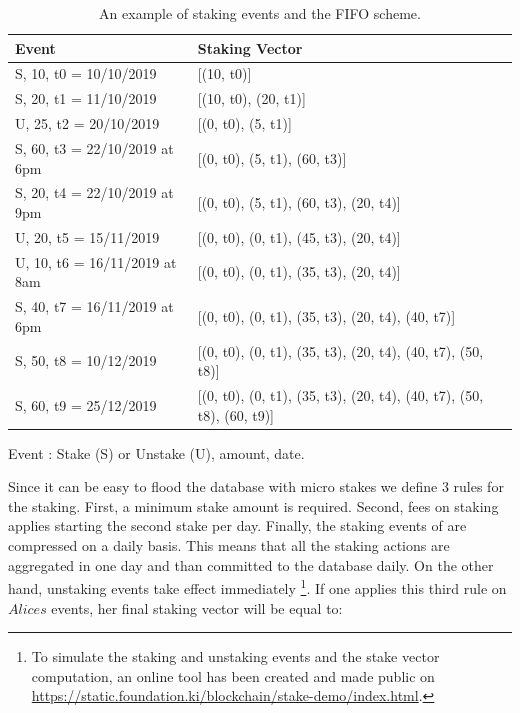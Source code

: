 \documentclass[]{article}
\begin{document}
\begin{table}[]
\centering
\begin{threeparttable}
\begin{tabular}{|l|p{8cm}|}
\hline
Event & Staking Vector \\
\hline
S, 10, t0 = 10/10/2019 & [(10, t0)]\\
S, 20, t1 = 11/10/2019 & [(10, t0), (20, t1)]\\
U, 25, t2 = 20/10/2019 & [(0, t0), (5, t1)]\\
S, 60, t3 = 22/10/2019 at 6pm  & [(0, t0), (5, t1), (60, t3)]\\
S, 20, t4 = 22/10/2019 at 9pm & [(0, t0), (5, t1), (60, t3), (20, t4)]\\
U, 20, t5 = 15/11/2019 & [(0, t0), (0, t1), (45, t3), (20, t4)]\\
U, 10, t6 = 16/11/2019 at 8am & [(0, t0), (0, t1), (35, t3), (20, t4)]\\
S, 40, t7 = 16/11/2019 at 6pm & [(0, t0), (0, t1), (35, t3), (20, t4), (40, t7)]\\
S, 50, t8 = 10/12/2019 & [(0, t0), (0, t1), (35, t3), (20, t4), (40, t7), (50, t8)]\\
S, 60, t9 = 25/12/2019 & [(0, t0), (0, t1), (35, t3), (20, t4), (40, t7), (50, t8), (60, t9)]\\
\hline
\end{tabular}
\begin{tablenotes}
\centering
      \small
      \item Event : Stake (S) or Unstake (U), amount, date.
    \end{tablenotes}
 \end{threeparttable}
 \caption{An example of staking events and the FIFO scheme.}
\label{tab:stakeex}
\end{table}

Since it can be easy to flood the database with micro stakes we define 3 rules for the staking. First, a minimum stake amount is required. Second, fees on staking applies starting the second stake per day. Finally, the staking events of are compressed on a daily basis. This means that all the staking actions are aggregated in one day and than committed to the database daily. On the other hand, unstaking events take effect immediately \footnote{ To simulate the staking and unstaking events and the stake vector computation, an online tool has been created and made public on \url{https://static.foundation.ki/blockchain/stake-demo/index.html}.}. If one applies this third rule on $Alices$ events, her final staking vector will be equal to: 
\end{document}
